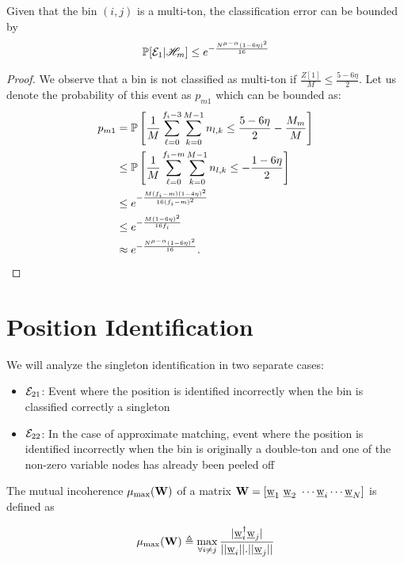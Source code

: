 \begin{lemma}
\label{Lem:MultitonClassif}
Given that the bin $(i,j)$ is a multi-ton, the classification error can be bounded by
\begin{align*}
\mathbb{P}[\mathcal{E}_1|\mathscr{H}_m]\leq e^{-\frac{N^{\mu-\alpha}(1-6\eta)^2}{16}}
\end{align*}
\end{lemma}
\begin{proof}
We observe that a bin is not classified as multi-ton if $\frac{Z[1]}{M}\leq\frac{5-6\eta}{2}$. Let us denote the probability of this event as $p_{m1}$ which can be bounded as:
\begin{align*}
p_{m1}&=\mathbb{P}\left[\frac{1}{M}\sum\limits_{\ell=0}^{f_{i}-3}\sum\limits_{k=0}^{M-1} n_{l,k}\leq\frac{5-6\eta}{2}-\frac{M_m}{M}\right]\\
&\leq \mathbb{P}\left[\frac{1}{M}\sum\limits_{\ell=0}^{f_{i}-m}\sum\limits_{k=0}^{M-1} n_{l,k}\leq-\frac{1-6\eta}{2}\right]\\
&\leq e^{-\frac{M(f_i-m)(1-4\eta)^2}{16(f_i-m)^{2}}}\\
&\leq e^{-\frac{M(1-6\eta)^2}{16 f_i}}\\
 &\approx e^{-\frac{N^{\mu-\alpha}(1-6\eta)^2}{16}}.
\end{align*} 
\end{proof}

\section{Position Identification}
\label{Append:PositionIdentif}
We will analyze the singleton identification in two separate cases:
\begin{itemize}
\item $\mathcal{E}_{21}$: Event where the position is identified incorrectly when the bin is classified  correctly a singleton
\item $\mathcal{E}_{22}$: In the case of approximate matching, event where the position is identified incorrectly when the bin is originally a double-ton and one of the non-zero variable nodes has already been peeled off
\end{itemize}

\begin{definition}
	The mutual incoherence $\mu_{\text{max}}( \mathbf{W})$ of a matrix $\mathbf{W} = [\underline{\mathrm{w}}_1 ~ \underline{\mathrm{w}}_2 ~ \cdots \underline{\mathrm{w}}_i \cdots \underline{\mathrm{w}}_N ]$ is defined as 
	
	\[\mu_{\text{max}}(\mathbf{W}) \triangleq \max \limits_{\forall i \neq j} \frac{|\underline{\mathrm{w}}_i^{\dagger} \underline{\mathrm{w}}_j |}{||\underline{\mathrm{w}}_i || . ||\underline{\mathrm{w}}_j ||} \]
\end{definition}

